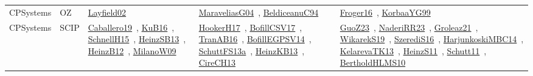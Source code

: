 {\begin{longtable}{lp{3cm}>{\raggedright\arraybackslash}p{6cm}>{\raggedright\arraybackslash}p{6cm}>{\raggedright\arraybackslash}p{8cm}}
CPSystems & OZ & \href{../works/Layfield02.pdf}{Layfield02}~\cite{Layfield02} & \href{../works/MaraveliasG04.pdf}{MaraveliasG04}~\cite{MaraveliasG04}, \href{../works/BeldiceanuC94.pdf}{BeldiceanuC94}~\cite{BeldiceanuC94} & \href{../works/Froger16.pdf}{Froger16}~\cite{Froger16}, \href{../works/KorbaaYG99.pdf}{KorbaaYG99}~\cite{KorbaaYG99}\\
CPSystems & SCIP & \href{../works/Caballero19.pdf}{Caballero19}~\cite{Caballero19}, \href{../works/KuB16.pdf}{KuB16}~\cite{KuB16}, \href{../works/SchnellH15.pdf}{SchnellH15}~\cite{SchnellH15}, \href{../works/HeinzSB13.pdf}{HeinzSB13}~\cite{HeinzSB13}, \href{../works/HeinzB12.pdf}{HeinzB12}~\cite{HeinzB12}, \href{../works/MilanoW09.pdf}{MilanoW09}~\cite{MilanoW09} & \href{../works/HookerH17.pdf}{HookerH17}~\cite{HookerH17}, \href{../works/BofillCSV17.pdf}{BofillCSV17}~\cite{BofillCSV17}, \href{../works/TranAB16.pdf}{TranAB16}~\cite{TranAB16}, \href{../works/BofillEGPSV14.pdf}{BofillEGPSV14}~\cite{BofillEGPSV14}, \href{../works/SchuttFS13a.pdf}{SchuttFS13a}~\cite{SchuttFS13a}, \href{../works/HeinzKB13.pdf}{HeinzKB13}~\cite{HeinzKB13}, \href{../works/CireCH13.pdf}{CireCH13}~\cite{CireCH13} & \href{../works/GuoZ23.pdf}{GuoZ23}~\cite{GuoZ23}, \href{../works/NaderiRR23.pdf}{NaderiRR23}~\cite{NaderiRR23}, \href{../works/Groleaz21.pdf}{Groleaz21}~\cite{Groleaz21}, \href{../works/WikarekS19.pdf}{WikarekS19}~\cite{WikarekS19}, \href{../works/SzerediS16.pdf}{SzerediS16}~\cite{SzerediS16}, \href{../works/HarjunkoskiMBC14.pdf}{HarjunkoskiMBC14}~\cite{HarjunkoskiMBC14}, \href{../works/KelarevaTK13.pdf}{KelarevaTK13}~\cite{KelarevaTK13}, \href{../works/HeinzS11.pdf}{HeinzS11}~\cite{HeinzS11}, \href{../works/Schutt11.pdf}{Schutt11}~\cite{Schutt11}, \href{../works/BertholdHLMS10.pdf}{BertholdHLMS10}~\cite{BertholdHLMS10}\\

\end{longtable}}
